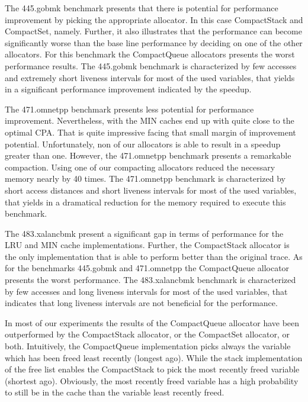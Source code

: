 \documentclass[onecolumn, openright, master, english, signatures]{dbrgrptt}
\begin{document}
The 445.gobmk benchmark presents that there is potential for performance improvement by picking the appropriate allocator.
In this case CompactStack and CompactSet, namely.
Further, it also illustrates that the performance can become significantly worse than the base line performance by deciding on one of the other allocators.
For this benchmark the CompactQueue allocators presents the worst performance results.
The 445.gobmk benchmark is characterized by few accesses and extremely short liveness intervals for most of the used variables, that yields in a significant performance improvement indicated by the speedup.

The 471.omnetpp benchmark presents less potential for performance improvement.
Nevertheless, with the \ac{MIN} caches end up with quite close to the optimal \ac{CPA}.
That is quite impressive facing that small margin of improvement potential.
Unfortunately, non of our allocators is able to result in a speedup greater than one.
However, the 471.omnetpp benchmark presents a remarkable compaction.
Using one of our compacting allocators reduced the necessary memory nearly by 40 times.
The 471.omnetpp benchmark is characterized by short access distances and short liveness intervals for most of the used variables, that yields in a dramatical reduction for the memory required to execute this benchmark.

The 483.xalancbmk present a significant gap in terms of performance for the \ac{LRU} and \ac{MIN} cache implementations.
Further, the CompactStack allocator is the only implementation that is able to perform better than the original \ac{trace}.
As for the benchmarks 445.gobmk and 471.omnetpp the CompactQueue allocator presents the worst performance.
The 483.xalancbmk benchmark is characterized by few accesses and long liveness intervals for most of the used variables, that indicates that long liveness intervals are not beneficial for the performance.

In most of our experiments the results of the CompactQueue allocator have been outperformed by the CompactStack allocator, or the CompactSet allocator, or both.
Intuitively, the CompactQueue implementation picks always the variable which has been freed least recently (longest ago).
While the stack implementation of the free list enables the CompactStack to pick the most recently freed variable (shortest ago).
Obviously, the most recently freed variable has a high probability to still be in the cache than the variable least recently freed.

\end{document}
